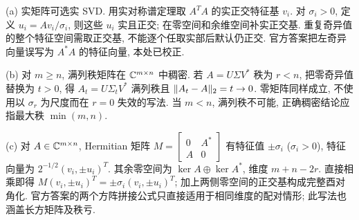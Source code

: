 \begin{solution}
(a) 实矩阵可选实 SVD. 用实对称谱定理取 $A^TA$ 的实正交特征基 $v_i$. 对 $\sigma_i>0$, 定义 $u_i=Av_i/\sigma_i$, 则这些 $u_i$ 实且正交; 在零空间和余维空间补实正交基. 重复奇异值的整个特征空间需取正交基, 不能逐个任取实部后默认仍正交. 官方答案把左奇异向量误写为 $A^*A$ 的特征向量, 本处已校正.

(b) 对 $m\ge n$, 满列秩矩阵在 $\mathbb C^{m\times n}$ 中稠密. 若 $A=U\Sigma V^*$ 秩为 $r<n$, 把零奇异值替换为 $t>0$, 得 $A_t=U\Sigma_tV^*$ 满列秩且 $\lVert A_t-A\rVert_2=t\to0$. 零矩阵同样成立, 不使用以 $\sigma_r$ 为尺度而在 $r=0$ 失效的写法. 当 $m<n$, 满列秩不可能, 正确稠密结论应指最大秩 $\min(m,n)$.

(c) 对 $A\in\mathbb C^{m\times n}$, Hermitian 矩阵 $M=\begin{bmatrix}0&A^*\\A&0\end{bmatrix}$ 有特征值 $\pm\sigma_i$ ($\sigma_i>0$), 特征向量为 $2^{-1/2}(v_i,\pm u_i)^T$. 其余零空间为 $\ker A\oplus\ker A^*$, 维度 $m+n-2r$. 直接相乘即得 $M(v_i,\pm u_i)^T=\pm\sigma_i(v_i,\pm u_i)^T$; 加上两侧零空间的正交基构成完整酉对角化. 官方答案的两个方阵拼接公式只直接适用于相同维度的配对情形; 此写法也涵盖长方矩阵及秩亏.
\end{solution}
